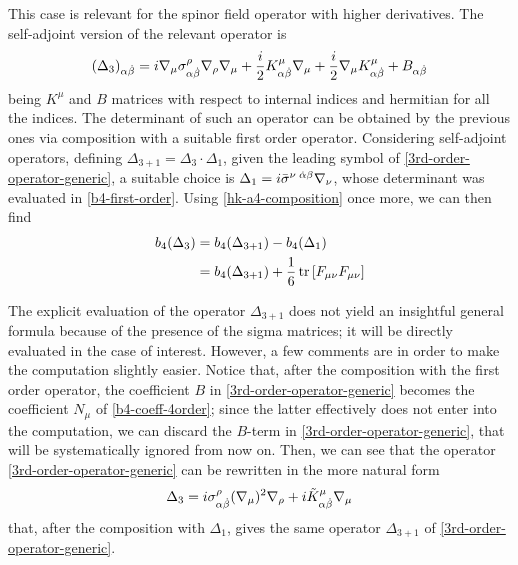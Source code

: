 This case is relevant for the spinor field operator with higher derivatives. The self-adjoint version of the relevant operator  is
\begin{equation}\label{3rd-order-operator-generic}
(\Delta_{3})_{\alpha \dot \beta} 
=
i { \mathcal{\nabla} }_\mu \sigma^\rho_{\alpha \dot \beta} { \mathcal{\nabla} }_\rho { \mathcal{\nabla} }_\mu
+
\frac{i}{2} K^{\mu}_{\alpha \dot \beta} { \mathcal{\nabla} }_\mu
+
\frac{i}{2} { \mathcal{\nabla} }_\mu K^{\mu}_{\alpha \dot \beta} 
+
B_{\alpha \dot \beta}
\end{equation}
being $K^\mu$ and $B$ matrices with respect to internal indices and hermitian for all the indices. The determinant of such an operator can be obtained by the previous ones via composition with a suitable first order operator. Considering self-adjoint operators, defining \( \Delta_{3+1} = \Delta_3 \cdot \Delta_1 \), 
given the leading symbol of \eqref{3rd-order-operator-generic}, a suitable choice is
\(
	\Delta_1 =  i \bar \sigma^{\nu\; \dot \alpha \beta}{ \mathcal{\nabla} }_\nu
\), whose determinant was evaluated in \eqref{b4-first-order}.
Using \eqref{hk-a4-composition} once more, we can then find
\begin{equation}\label{b4-coeff-3order-implicit}
\begin{split}
b_4(\Delta_3) & = b_4(\Delta_{3+1}) - b_4(\Delta_1) \\
& =  b_4(\Delta_{3+1}) 
+	
\frac{1}{6}
	\operatorname{tr} \left[
		  F_{\mu\nu} F_{\mu\nu}
	\right]
\end{split}
\end{equation}

The explicit evaluation of the operator \(\Delta_{3+1}\) does not yield an insightful  general formula because of the presence of the sigma matrices; it will be directly evaluated in the case of interest.
However, a few comments are in order to make the computation slightly easier. Notice that, after the composition with the first order operator, the coefficient $B$ in \eqref{3rd-order-operator-generic} becomes the coefficient  \(N_\mu\) of \eqref{b4-coeff-4order}; since the latter effectively does not enter into the computation, we can discard the $B$-term in \eqref{3rd-order-operator-generic}, that will be systematically ignored from now on. Then, we can see that the operator \eqref{3rd-order-operator-generic} can be rewritten in the more natural  form
\begin{equation}\label{3rd-order-operator}
\Delta_{3}
=
i \sigma^\rho_{\alpha \dot \beta} ( { \mathcal{\nabla} }_\mu )^2 { \mathcal{\nabla} }_\rho 
+
i \tilde K^{\mu}_{\alpha \dot \beta} { \mathcal{\nabla} }_\mu
\end{equation}
that, after the composition with $\Delta_1$, gives the same operator $\Delta_{3+1}$ of \eqref{3rd-order-operator-generic}.

